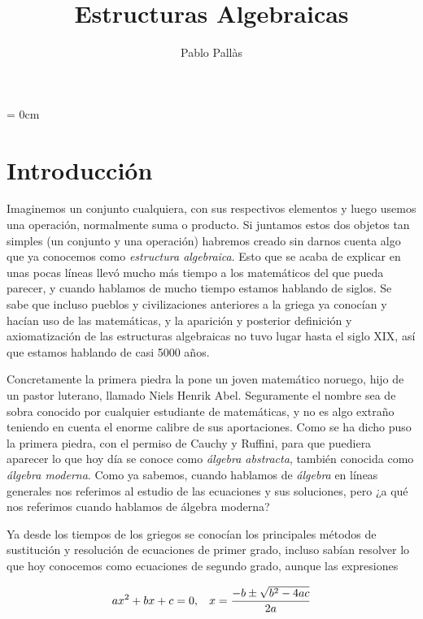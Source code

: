 \documentclass[12pt]{article}
\author{Pablo Pallàs}
\title{Estructuras Algebraicas}
\begin{document}
\rmfamily
\maketitle
\vspace{2.5cm}
\tableofcontents
\parindent= 0cm
\newpage
\section{Introducción}

Imaginemos un conjunto cualquiera, con sus respectivos elementos y luego usemos una operación, normalmente suma o producto. Si juntamos estos dos objetos tan simples (un conjunto y una operación) habremos creado sin darnos cuenta algo que ya conocemos como \textit{estructura algebraica}. Esto que se acaba de explicar en unas pocas líneas llevó mucho más tiempo a los matemáticos del que pueda parecer, y cuando hablamos de mucho tiempo estamos hablando de siglos. Se sabe que incluso pueblos y civilizaciones anteriores a la griega ya conocían y hacían uso de las matemáticas, y la aparición y posterior definición y axiomatización de las estructuras algebraicas no tuvo lugar hasta el siglo XIX, así que estamos hablando de casi 5000 años.

Concretamente la primera piedra la pone un joven matemático noruego, hijo de un pastor luterano, llamado Niels Henrik Abel. Seguramente el nombre sea de sobra conocido por cualquier estudiante de matemáticas, y no es algo extraño teniendo en cuenta el enorme calibre de sus aportaciones. Como se ha dicho puso la primera piedra, con el permiso de Cauchy y Ruffini, para que puediera aparecer lo que hoy día se conoce como \textit{álgebra abstracta}, también conocida como \textit{álgebra moderna}. Como ya sabemos, cuando hablamos de \textit{álgebra} en líneas generales nos referimos al estudio de las ecuaciones y sus soluciones, pero ¿a qué nos referimos cuando hablamos de álgebra moderna?

Ya desde los tiempos de los griegos se conocían los principales métodos de sustitución y resolución de ecuaciones de primer grado, incluso sabían resolver lo que hoy conocemos como ecuaciones de segundo grado, aunque las expresiones 

$$ax^{2}+bx +c=0, \hspace{0.3cm} x=\dfrac{-b \pm \sqrt{b^{2}-4ac}}{2a}$$ 
\end{document}
